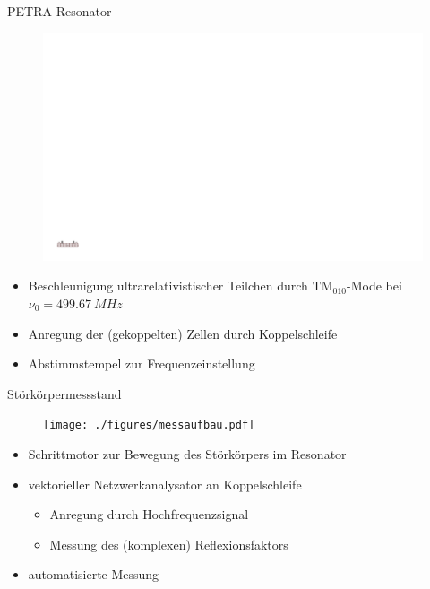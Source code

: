 \documentclass[12pt,xcolor=dvipsnames,professionalfonts]{beamer}
\begin{document}
\begin{frame}{PETRA-Resonator}
	\begin{figure}
		\centering
		\includegraphics[scale=0.6]{./figures/cavity.pdf}
	\end{figure}
	
	\begin{itemize}
		\setlength\itemsep{1.0em}
		\item Beschleunigung ultrarelativistischer Teilchen durch $\mathrm{TM}_{010}$-Mode bei $\nu_0 = \SI{499.67}{MHz}$
		
		\item Anregung der (gekoppelten) Zellen durch Koppelschleife
		
		\item Abstimmstempel zur Frequenzeinstellung
		
	\end{itemize}
\end{frame}

\begin{frame}{Störkörpermessstand}
	\begin{figure}
		\centering
		\texttt{[image: ./figures/messaufbau.pdf]}
	\end{figure}
	\begin{itemize}
		\setlength\itemsep{0.5em}
		\item Schrittmotor zur Bewegung des Störkörpers im Resonator
		\item vektorieller Netzwerkanalysator an Koppelschleife
		\begin{itemize}
			\item Anregung durch Hochfrequenzsignal
			\item Messung des (komplexen) Reflexionsfaktors
		\end{itemize}
		\item automatisierte Messung
	\end{itemize}	
\end{frame}
\end{document}
